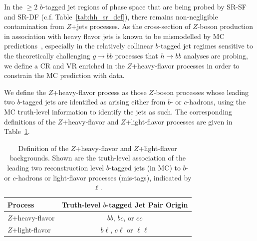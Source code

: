 In the $\ge 2$ $b$-tagged jet regions of phase space that are being probed by SR-SF and SR-DF (c.f. Table~\ref{tab:hh_sr_def}),
there remains non-negligible contamination from $Z$+jets processes.
As the cross-section of $Z$-boson production in association with heavy flavor jets is known to be mismodelled
by MC predictions~\cite{Chatrchyan:2013zja,Aad:2014dvb}, especially in the relatively
collinear $b$-tagged jet regimes sensitive to the theoretically challenging $g \rightarrow bb$ processes
that $h \rightarrow bb$ analyses are probing, we define a CR and VR enriched in the
$Z$+heavy-flavor processes in order to constrain the MC prediction with data.

We define the $Z$+heavy-flavor process as those $Z$-boson processes whose leading two $b$-tagged
jets are identified as arising either from $b$- or $c$-hadrons, using the MC truth-level information
to identify the jets as such.
The corresponding definitions of the $Z$+heavy-flavor and $Z$+light-flavor processes are given
in Table~\ref{tab:zhf_def}.

\begin{table}[!htb]
    \begin{center}
        \caption{
            Definition of the $Z$+heavy-flavor and $Z$+light-flavor backgrounds.
            Shown are the truth-level association of the leading two reconstruction level $b$-tagged
            jets (in MC) to $b$- or $c$-hadrons or light-flavor processes (mis-tags), indicated
            by $\ell$.
        }        
        \label{tab:zhf_def}
        \begin{tabular}{l|c}
        \hline
        \hline
            \textbf{Process} & \textbf{Truth-level $b$-tagged Jet Pair Origin} \\
            \hline
            $Z$+heavy-flavor & $bb$, $bc$, or $cc$ \\
            $Z$+light-flavor & $b \ell$, $c \ell$ or $\ell \ell$ \\
        \hline
        \hline
        \end{tabular}
    \end{center}
\end{table}

